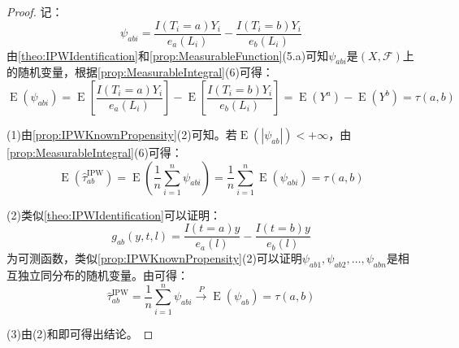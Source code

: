 \begin{proof}
	记：
	\begin{equation*}
		\psi_{abi}=\frac{I(T_i=a)Y_i}{e_a(L_i)}-\frac{I(T_i=b)Y_i}{e_b(L_i)}
	\end{equation*}
	由\cref{theo:IPWIdentification}和\cref{prop:MeasurableFunction}(5.a)可知$\psi_{abi}$是$(X,\mathscr{F})$上的随机变量，根据\cref{prop:MeasurableIntegral}(6)可得：
	\begin{equation*}
		\operatorname{E}(\psi_{abi})=\operatorname{E}\left[\frac{I(T_i=a)Y_i}{e_a(L_i)}\right]-\operatorname{E}\left[\frac{I(T_i=b)Y_i}{e_b(L_i)}\right]=\operatorname{E}(Y^a)-\operatorname{E}(Y^b)=\tau(a,b)
	\end{equation*}\par
	(1)由\cref{prop:IPWKnownPropensity}(2)可知。若$\operatorname{E}(|\psi_{ab}|)<+\infty$，由\cref{prop:MeasurableIntegral}(6)可得：
	\begin{equation*}
		\operatorname{E}(\hat{\tau}_{ab}^{\text{IPW}})=\operatorname{E}\left(\frac{1}{n}\sum_{i=1}^{n}\psi_{abi}\right)=\frac{1}{n}\sum_{i=1}^{n}\operatorname{E}(\psi_{abi})=\tau(a,b)
	\end{equation*}\par
	(2)类似\cref{theo:IPWIdentification}可以证明：
	\begin{equation*}
		g_{ab}(y,t,l)=\frac{I(t=a)y}{e_a(l)}-\frac{I(t=b)y}{e_b(l)}
	\end{equation*}
	为可测函数，类似\cref{prop:IPWKnownPropensity}(2)可以证明$\psi_{ab1},\psi_{ab2},\dots,\psi_{abn}$是相互独立同分布的随机变量。由可得：
	\begin{equation*}
		\hat{\tau}_{ab}^{\text{IPW}}=\frac{1}{n}\sum_{i=1}^{n}\psi_{abi}\overset{P}{\longrightarrow}\operatorname{E}(\psi_{ab})=\tau(a,b)
	\end{equation*}\par
	(3)由(2)和即可得出结论。
\end{proof}